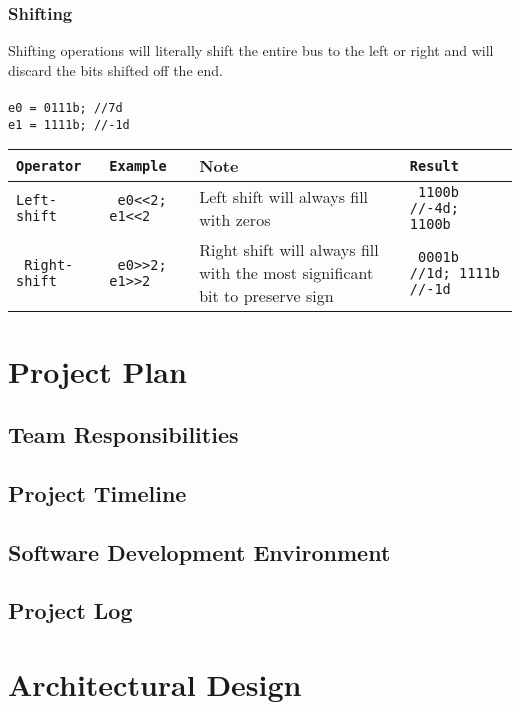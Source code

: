 \documentclass[letterpaper,11pt]{article}
\begin{document}
        \subsubsection{Shifting}
Shifting operations will literally shift the entire bus to the left or right and will discard the bits shifted off the end.\\\\
\texttt{e0 = 0111b; //7d}\\
\texttt{e1 = 1111b; //-1d}\\
        
        \begin{center} 
        \begin{tabular}{|>{\texttt\bgroup}l<{\egroup}|>{\texttt\bgroup}l<{\egroup}|p{2in}|>{\texttt\bgroup}l<{\egroup}|}
        \hline
        Operator&Example&Note&Result\\ \hline
        Left-shift &	e0<<2; e1<<2	&	Left shift will always fill with zeros     	&	1100b //-4d; 1100b	  \\ \hline
        Right-shift &	e0>>2; e1>>2	&	Right shift will always fill with the most significant bit to preserve sign &	0001b //1d; 1111b //-1d \\ \hline
\end{tabular}
\end{center}
        

\section{Project Plan}
    \subsection{Team Responsibilities}
    \subsection{Project Timeline}
    \subsection{Software Development Environment}
    \subsection{Project Log}
    
\section{Architectural Design}
\end{document}
